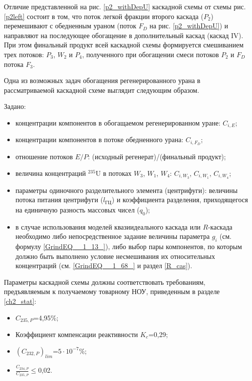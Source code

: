 Отличие представленной на рис. \ref{p2_withDepU} каскадной схемы от схемы рис. \ref{p2left} состоит в том, что поток легкой фракции второго каскада ($P_2$) перемешивают с обедненным ураном (поток $F_{D}$ на рис. \ref{p2_withDepU}) и направляют на последующее обогащение в дополнительный каскад (каскад IV). При этом финальный продукт всей каскадной схемы формируется смешиванием трех потоков: $P_3$, $W_2$ и $P_4$, полученного при обогащении смеси потоков $P_2$ и $F_{D}$ потока $F_3$.

Одна из возможных задач обогащения регенерированного урана в рассматриваемой каскадной схеме выглядит следующим образом.

Задано:

\begin{itemize}
    \item концентрации компонентов в обогащаемом регенерированном уране: $C_{i,{E}}$;
    \item концентрации компонентов в потоке обедненного урана: $C_{i,{F_{D}}}$;
    \item отношение потоков $E/P$: (исходный регенерат)/(финальный продукт);
    \item величина концентраций $^{235}$U в потоках $W_{3}$, $W_{1}$, $W_{4}$: $C_{i,{W_3}}$, $C_{i,{W_1}}$, $C_{i,{W_4}}$;
    \item параметры одиночного разделительного элемента (центрифуги): величины потока питания центрифуги ($l_\textit{ГЦ}$) и коэффициента разделения, приходящегося на единичную разность массовых чисел ($q_{0}$);
    \item в случае использования моделей квазиидеального каскада или $R$-каскада необходимо либо непосредственное задание величины параметра $g_i$ (см. формулу \ref{GrindEQ__1_13_}), либо выбор пары компонентов, по которым должно быть выполнено условие несмешивания их относительных концентраций (см. \ref{GrindEQ__1_68_} и раздел \ref{R_cas}).
\end{itemize}

Параметры каскадной схемы должны соответствовать требованиям, предъявляемым к получаемому товарному НОУ, приведенным в разделе \ref{ch2_stat}:

\begin{itemize}
    \item $C_{235,{P}}$=4,95\%;
    \item Коэффициент компенсации реактивности $K_{c}$=0,29;
    \item $(C_{232,{P}})_{lim}$=$5\cdot10^{-7}$\%;
    \item $\frac{C_{234,P}}{C_{235,P}}\le$0,02.
\end{itemize}

